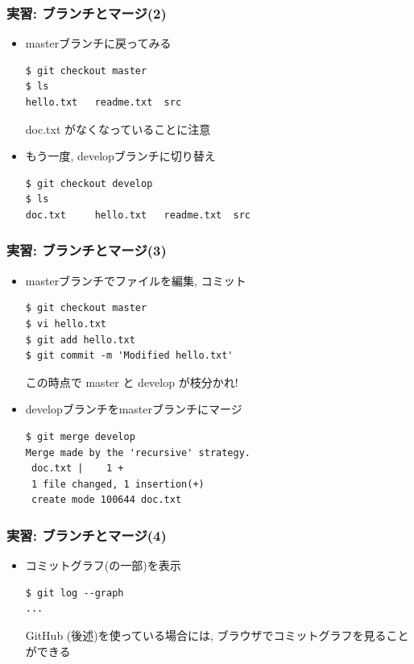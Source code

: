 \begin{frame}[t,fragile]
  \frametitle{実習: ブランチとマージ(2)}
  \begin{itemize}
  \item masterブランチに戻ってみる
\begin{lstlisting}
$ git checkout master
$ ls
hello.txt	readme.txt	src
\end{lstlisting}
doc.txt がなくなっていることに注意 \\[.5em]
  \item もう一度, developブランチに切り替え
\begin{lstlisting}
$ git checkout develop
$ ls
doc.txt		hello.txt	readme.txt	src
\end{lstlisting}
  \end{itemize}
\end{frame}

\begin{frame}[t,fragile]
  \frametitle{実習: ブランチとマージ(3)}
  \begin{itemize}
  \item masterブランチでファイルを編集, コミット
\begin{lstlisting}
$ git checkout master
$ vi hello.txt
$ git add hello.txt
$ git commit -m 'Modified hello.txt'
\end{lstlisting}
この時点で master と develop が枝分かれ! \\[.5em]
  \item developブランチをmasterブランチにマージ
\begin{lstlisting}
$ git merge develop
Merge made by the 'recursive' strategy.
 doc.txt |    1 +
 1 file changed, 1 insertion(+)
 create mode 100644 doc.txt
\end{lstlisting}
  \end{itemize}
\end{frame}

\begin{frame}[t,fragile]
  \frametitle{実習: ブランチとマージ(4)}
  \begin{itemize}
  \item コミットグラフ(の一部)を表示
\begin{lstlisting}
$ git log --graph
...
\end{lstlisting}
GitHub (後述)を使っている場合には, ブラウザでコミットグラフを見ることができる
  \end{itemize}
\end{frame}

